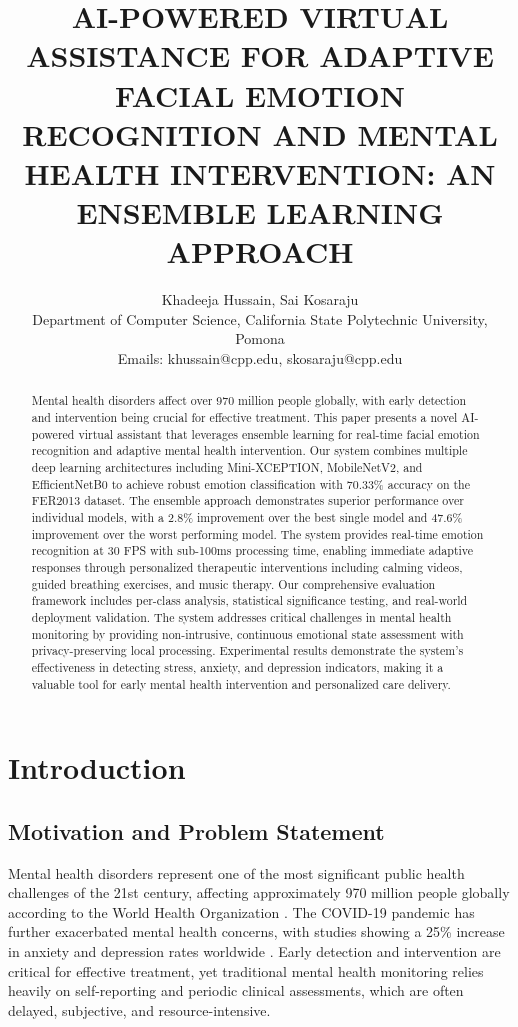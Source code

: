 \documentclass[conference]{IEEEtran}
\title{AI-POWERED VIRTUAL ASSISTANCE FOR ADAPTIVE FACIAL EMOTION RECOGNITION AND MENTAL HEALTH INTERVENTION: AN ENSEMBLE LEARNING APPROACH}
\author{
Khadeeja Hussain, Sai Kosaraju \\
Department of Computer Science, California State Polytechnic University, Pomona \\
Emails: khussain@cpp.edu, skosaraju@cpp.edu
}
\begin{document}
\maketitle

\begin{abstract}
Mental health disorders affect over 970 million people globally, with early detection and intervention being crucial for effective treatment. This paper presents a novel AI-powered virtual assistant that leverages ensemble learning for real-time facial emotion recognition and adaptive mental health intervention. Our system combines multiple deep learning architectures including Mini-XCEPTION, MobileNetV2, and EfficientNetB0 to achieve robust emotion classification with 70.33\% accuracy on the FER2013 dataset. The ensemble approach demonstrates superior performance over individual models, with a 2.8\% improvement over the best single model and 47.6\% improvement over the worst performing model. The system provides real-time emotion recognition at 30 FPS with sub-100ms processing time, enabling immediate adaptive responses through personalized therapeutic interventions including calming videos, guided breathing exercises, and music therapy. Our comprehensive evaluation framework includes per-class analysis, statistical significance testing, and real-world deployment validation. The system addresses critical challenges in mental health monitoring by providing non-intrusive, continuous emotional state assessment with privacy-preserving local processing. Experimental results demonstrate the system's effectiveness in detecting stress, anxiety, and depression indicators, making it a valuable tool for early mental health intervention and personalized care delivery.
\end{abstract}

\section{Introduction}

\subsection{Motivation and Problem Statement}
Mental health disorders represent one of the most significant public health challenges of the 21st century, affecting approximately 970 million people globally according to the World Health Organization \cite{who2022mental}. The COVID-19 pandemic has further exacerbated mental health concerns, with studies showing a 25\% increase in anxiety and depression rates worldwide \cite{santomauro2021global}. Early detection and intervention are critical for effective treatment, yet traditional mental health monitoring relies heavily on self-reporting and periodic clinical assessments, which are often delayed, subjective, and resource-intensive.
\end{document}
